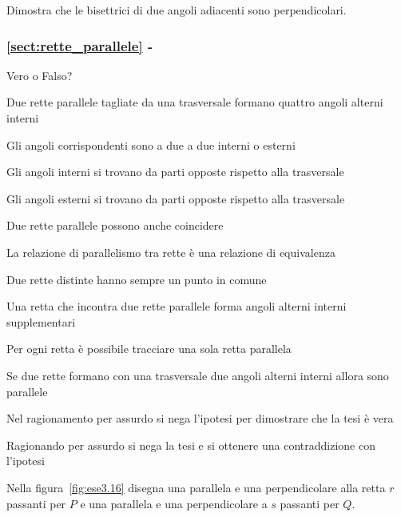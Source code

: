 \begin{esercizio}
\label{ese:3.14}
Dimostra che le bisettrici di due angoli adiacenti sono 
perpendicolari.
\end{esercizio}

\begingroup
\hypersetup{linkcolor=black}
\subsubsection*{\ref{sect:rette_parallele} - 
}
\endgroup

\begin{esercizio}
\label{ese:3.15}
Vero o Falso?
\begin{enumeratea}
\item Due rette parallele tagliate da una trasversale formano quattro 
angoli alterni interni\tab\hfill\boxV\quad\boxF
\item Gli angoli corrispondenti sono a due a due interni o 
esterni\hfill\boxV\quad\boxF
\item Gli angoli interni si trovano da parti opposte rispetto alla 
trasversale\hfill\boxV\quad\boxF
\item Gli angoli esterni si trovano da parti opposte rispetto alla 
trasversale\hfill\boxV\quad\boxF
\item Due rette parallele possono anche 
coincidere\hfill\boxV\quad\boxF
\item La relazione di parallelismo tra rette è una relazione di 
equivalenza\hfill\boxV\quad\boxF
\item Due rette distinte hanno sempre un punto in 
comune\hfill\boxV\quad\boxF
\item Una retta che incontra due rette parallele forma angoli alterni 
interni supplementari\tab\hfill\boxV\quad\boxF
\item Per ogni retta è possibile tracciare una sola retta 
parallela\hfill\boxV\quad\boxF
\item Se due rette formano con una trasversale due angoli alterni 
interni allora sono parallele\tab\hfill\boxV\quad\boxF
\item Nel ragionamento per assurdo si nega l'ipotesi per dimostrare 
che la tesi è vera\tab\tab\hfill\boxV\quad\boxF
\item Ragionando per assurdo si nega la tesi e si ottenere una 
contraddizione con l'ipotesi\tab\hfill\boxV\quad\boxF
\end{enumeratea}
\end{esercizio}

\begin{esercizio}
\label{ese:3.16}
Nella figura~\ref{fig:ese3.16} disegna una parallela e una 
perpendicolare alla retta \(r\) passanti per \(P\) e una parallela e una 
perpendicolare a \(s\) passanti per \(Q\).
\end{esercizio}

